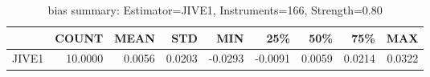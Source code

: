 \begin{table}[ht]
\centering
\caption{bias summary: Estimator=JIVE1, Instruments=166, Strength=0.80}
\begin{tabular}{lrrrrrrrr}
\toprule
 & COUNT & MEAN & STD & MIN & 25\% & 50\% & 75\% & MAX \\
\midrule
JIVE1 & 10.0000 & 0.0056 & 0.0203 & -0.0293 & -0.0091 & 0.0059 & 0.0214 & 0.0322 \\
\bottomrule
\end{tabular}
\end{table}
